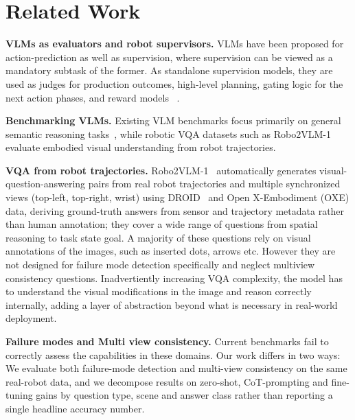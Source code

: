 \section{Related Work}
\label{sec:related}

\textbf{VLMs as evaluators and robot supervisors.} VLMs have been proposed for action-prediction as well as supervision, where supervision can be viewed as a mandatory subtask of the former. As standalone supervision models, they are used as judges for production outcomes, high-level planning, gating logic for the next action phases, and reward models~\cite{brohan2023rt2, Huang2023} .


\textbf{Benchmarking VLMs.}
Existing VLM benchmarks focus primarily on general semantic reasoning tasks~\cite{li2025benchmark,yang2025embodiedbench}, while robotic VQA datasets such as Robo2VLM-1~\cite{chen2025robo2vlm} evaluate embodied visual understanding from robot trajectories.

\textbf{VQA from robot trajectories.} Robo2VLM-1~\cite{chen2025robo2vlm} automatically generates visual-question-answering pairs from real robot trajectories and multiple synchronized views (top-left, top-right, wrist) using
DROID~\cite{khazatsky2024droid} and Open X-Embodiment (OXE) data, deriving ground-truth answers from sensor and trajectory metadata rather than human annotation; they cover a wide range of questions from spatial reasoning to task state goal. A majority of these questions rely on visual annotations of the images, such as inserted dots, arrows etc. However they are not designed for failure mode detection specifically and neglect multiview consistency questions. Inadvertiently increasing VQA complexity, the model has to understand the visual modifications in the image and reason correctly internally, adding a layer of abstraction beyond what is necessary in real-world deployment. 

\textbf{Failure modes and Multi view consistency.} Current benchmarks fail to correctly assess the capabilities in these domains. Our work differs in two ways: We evaluate both failure-mode detection and multi-view consistency on the same real-robot data, and we decompose results on zero-shot, CoT-prompting and fine-tuning gains by question type, scene and answer class rather than reporting a single headline accuracy number.